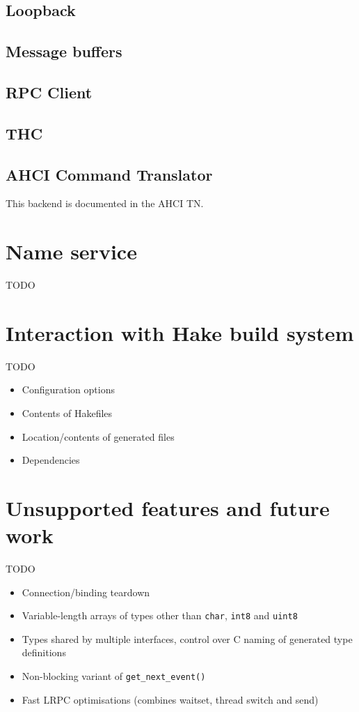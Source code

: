 \documentclass[a4paper,twoside]{report} %
\begin{document}
\section{Loopback}

\section{Message buffers}

\section{RPC Client}
\label{sec:rpcclient}

\section{THC}
\label{sec:thc}

\section{AHCI Command Translator}
\label{sec:ahci}

This backend is documented in the AHCI TN.

\chapter{Name service}
\label{cha:nameservice}

TODO


\chapter{Interaction with Hake build system}
\label{cha:hake}

TODO

\begin{itemize}
 \item Configuration options
 \item Contents of Hakefiles
 \item Location/contents of generated files
 \item Dependencies
\end{itemize}


\chapter{Unsupported features and future work}

TODO

\begin{itemize}
 \item Connection/binding teardown
 \item Variable-length arrays of types other than \lstinline+char+,
        \lstinline+int8+ and \lstinline+uint8+
 \item Types shared by multiple interfaces, control over C naming of generated
        type definitions
 \item Non-blocking variant of \lstinline+get_next_event()+
 \item Fast LRPC optimisations (combines waitset, thread switch and send)
\end{itemize}

 

\end{document}
